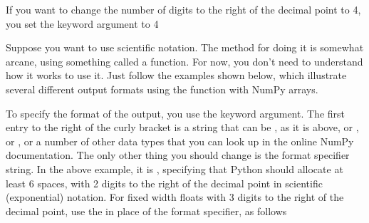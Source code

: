 \documentclass[letterpaper,10pt,english]{sphinxmanual}
\begin{document}
\sphinxAtStartPar
If you want to change the number of digits to the right of the decimal point to 4, you set the keyword argument  to 4

\begin{sphinxVerbatim}[commandchars=\\\{\}]
\end{sphinxVerbatim}

\sphinxAtStartPar
Suppose you want to use scientific notation.  The method for doing it is somewhat arcane, using something called a  function.  For now, you don’t need to understand how it works to use it.  Just follow the examples shown below, which illustrate several different output formats using the  function with NumPy arrays.

\begin{sphinxVerbatim}[commandchars=\\\{\},numbers=left,firstnumber=1,stepnumber=1]

\end{sphinxVerbatim}

\sphinxAtStartPar
To specify the format of the output, you use the  keyword argument.  The first entry to the right of the curly bracket is a string that can be , as it is above, or , or , or a number of other data types that you can look up in the online NumPy documentation.  The only other thing you should change is the format specifier string.  In the above example, it is , specifying that Python should allocate at least 6 spaces, with 2 digits to the right of the decimal point in scientific (exponential) notation.  For fixed width floats with 3 digits to the right of the decimal point, use the  in place of the  format specifier, as follows
\end{document}
